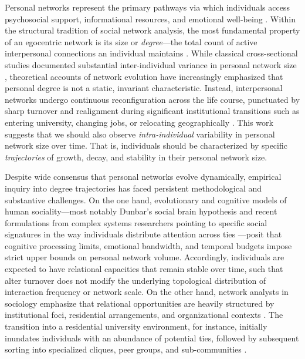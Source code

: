 \documentclass[12pt]{article}
\begin{document}
Personal networks represent the primary pathways via which individuals access psychosocial support, informational resources, and emotional well-being \citep{borgatti2009network, fischer1982dwell, lin2001social, smith2021social}. Within the structural tradition of social network analysis, the most fundamental property of an egocentric network is its size or \textit{degree}---the total count of active interpersonal connections an individual maintains \citep{marsden1987core, mccarty2019conducting}. While classical cross-sectional studies documented substantial inter-individual variance in personal network size \citep{campbell1991name, marsden1987core}, theoretical accounts of network evolution have increasingly emphasized that personal degree is not a static, invariant characteristic. Instead, interpersonal networks undergo continuous reconfiguration across the life course, punctuated by sharp turnover and realignment during significant institutional transitions such as entering university, changing jobs, or relocating geographically \citep{bidart2018personal, small2015how}. This work suggests that we should also observe \textit{intra-individual} variability in personal network size over time. That is, individuals should be characterized by specific \textit{trajectories} of growth, decay, and stability in their personal network size.

Despite wide consensus that personal networks evolve dynamically, empirical inquiry into degree trajectories has faced persistent methodological and substantive challenges. On the one hand, evolutionary and cognitive models of human sociality---most notably Dunbar's \citeyearpar{dunbar1992neocortex, dunbar1998social} social brain hypothesis and recent formulations from complex systems researchers pointing to specific social signatures in the way individuals distribute attention across ties \citep{heydari2018multichannel, saramaki2014persistence}---posit that cognitive processing limits, emotional bandwidth, and temporal budgets impose strict upper bounds on personal network volume. Accordingly, individuals are expected to have relational capacities that remain stable over time, such that alter turnover does not modify the underlying topological distribution of interaction frequency or network scale. On the other hand, network analysts in sociology emphasize that relational opportunities are heavily structured by institutional foci, residential arrangements, and organizational contexts \citep{feld1982social, small2009unanticipated, wang2020neither}. The transition into a residential university environment, for instance, initially inundates individuals with an abundance of potential ties, followed by subsequent sorting into specialized cliques, peer groups, and sub-communities \citep{sepulvado2020predicting, wang2020neither}.
\end{document}

